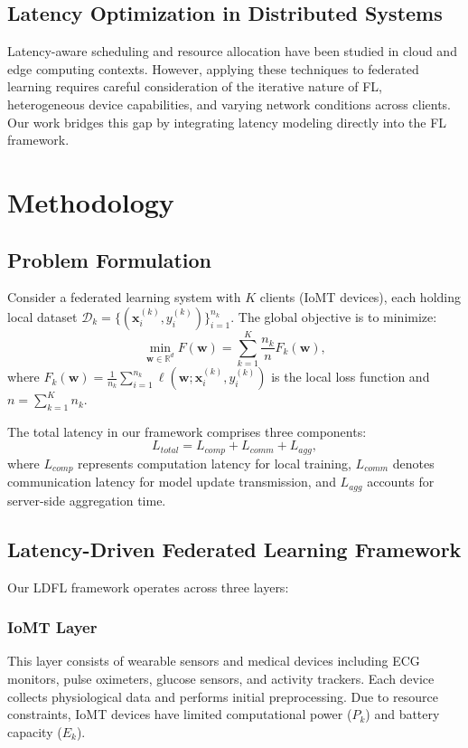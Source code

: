 \documentclass[10pt,conference]{IEEEtran}
\begin{document}
\subsection{Latency Optimization in Distributed Systems}
Latency-aware scheduling and resource allocation have been studied in cloud and edge computing contexts. However, applying these techniques to federated learning requires careful consideration of the iterative nature of FL, heterogeneous device capabilities, and varying network conditions across clients. Our work bridges this gap by integrating latency modeling directly into the FL framework.

\section{Methodology}
\label{sec:methodology}

\subsection{Problem Formulation}
Consider a federated learning system with $K$ clients (IoMT devices), each holding local dataset $\mathcal{D}_k = \{(\mathbf{x}_i^{(k)}, y_i^{(k)})\}_{i=1}^{n_k}$. The global objective is to minimize:
\begin{equation}
\min_{\mathbf{w} \in \mathbb{R}^d} F(\mathbf{w}) = \sum_{k=1}^K \frac{n_k}{n} F_k(\mathbf{w}),
\end{equation}
where $F_k(\mathbf{w}) = \frac{1}{n_k} \sum_{i=1}^{n_k} \ell(\mathbf{w}; \mathbf{x}_i^{(k)}, y_i^{(k)})$ is the local loss function and $n = \sum_{k=1}^K n_k$.

The total latency in our framework comprises three components:
\begin{equation}
L_{total} = L_{comp} + L_{comm} + L_{agg},
\end{equation}
where $L_{comp}$ represents computation latency for local training, $L_{comm}$ denotes communication latency for model update transmission, and $L_{agg}$ accounts for server-side aggregation time.

\subsection{Latency-Driven Federated Learning Framework}
Our LDFL framework operates across three layers:

\subsubsection{IoMT Layer}
This layer consists of wearable sensors and medical devices including ECG monitors, pulse oximeters, glucose sensors, and activity trackers. Each device collects physiological data and performs initial preprocessing. Due to resource constraints, IoMT devices have limited computational power ($P_k$) and battery capacity ($E_k$).
\end{document}
